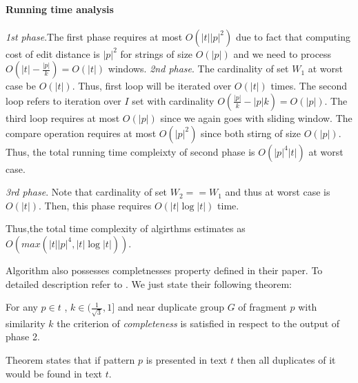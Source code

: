 \paragraph{Running time analysis}
\emph{1st phase}.The first phase requires at most  $O(|t||p|^2)$ due to fact
that computing cost of edit distance is $|p|^2$ for strings of size $O(|p|)$ and we need to process $O(|t|-\frac{|p|}{k})=O(|t|)$ windows.
\emph{2nd phase}. 
The cardinality of set $W_{1}$  at worst case be $O(|t|)$.
Thus, first loop will be iterated over $O(|t|)$ times.
The second loop refers to iteration over $I$ set with cardinality $O(\frac{|p|}{k}-|p|k) = O(|p|)$.
The third loop requires at most $O(|p|)$ since we again goes with sliding window.
The compare operation requires at most $O(|p|^2)$ since both
stirng of size $O(|p|)$.
Thus, the total running time compleixty of second phase is $O(|p|^4|t|)$ at worst case.

\emph{3rd phase}. 
Note that cardinality of set $W_{2}==W_{1}$ and thus at worst case is $O(|t|)$.
Then, this phase requires $O(|t| \log |t|)$ time. 

Thus,the total time complexity of algirthms estimates as 
$O(max(|t||p|^4,|t| \log|t|))$.

Algorithm also possesses completnesses property defined in their paper. 
To detailed description refer to \cite{}.
We just state their following theorem:
\begin{theorem}\cite{Luciv}
For any $p \in t$ , $k \in (\frac{1}{ \sqrt{3}} , 1]$ and near
duplicate group $G$ of fragment $p$ with similarity $k$ the criterion of \emph{completeness} is satisfied in
respect to the output of phase 2.
\end{theorem}

Theorem states that if pattern $p$ is presented in text $t$ then all duplicates of it would be found in text $t$. 
